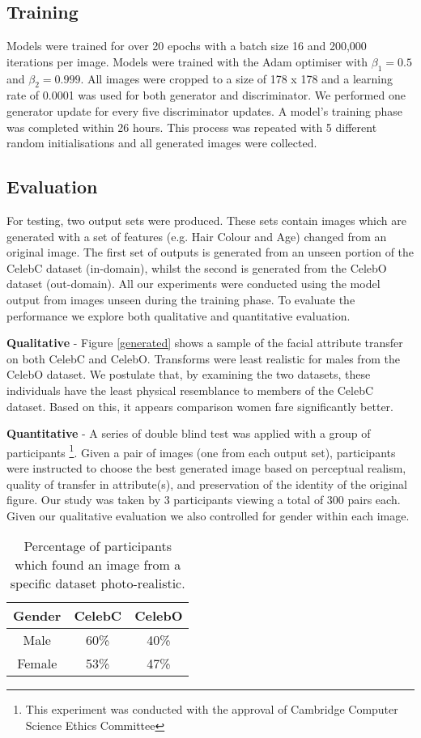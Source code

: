 \documentclass[10pt,twocolumn,letterpaper]{article}
\begin{document}
\subsection{Training}

Models were trained for over 20 epochs with a batch size 16 and 200,000 iterations per image. Models were trained with the Adam optimiser with $\beta_{1}=0.5$ and $\beta_{2}=0.999$. All images were cropped to a size of 178 x 178 and a learning rate of 0.0001 was used for both generator and discriminator. We performed one generator update for every five discriminator updates. A model's training phase was completed within 26 hours. This process was repeated with 5 different random initialisations and all generated images were collected. 

\subsection{Evaluation}

For testing, two output sets were produced. These sets contain images which are generated with a set of features (e.g. Hair Colour and Age) changed from an original image. The first set of outputs is generated from an unseen portion of the CelebC dataset (in-domain), whilst the second is generated from the CelebO dataset (out-domain). All our experiments were conducted using the model output from images unseen during the training phase. To evaluate the performance we explore both qualitative and quantitative evaluation.

\textbf{Qualitative} - Figure \ref{generated} shows a sample of the facial attribute transfer on both CelebC and CelebO. Transforms were least realistic for males from the CelebO dataset. We postulate that, by examining the two datasets, these individuals have the least physical resemblance to members of the CelebC dataset. Based on this, it appears comparison women fare significantly better.

\textbf{Quantitative} - A series of double blind test was applied with a group of participants \footnote{This experiment was conducted with the approval of Cambridge Computer Science Ethics Committee}. 
Given a pair of images (one from each output set), participants were instructed to choose the best generated
image based on perceptual realism, quality of transfer in attribute(s), and preservation of the identity of the original figure. Our study was taken by 3 participants viewing a total of 300 pairs each. Given our qualitative evaluation we also controlled for gender within each image.
\begin{table}[h!]
\begin{center}
\begin{tabular}{|c|c|c|}
\hline
Gender& CelebC & CelebO\\
\hline \hline
Male& 60\%& 40\% \\
Female &53\% & 47\%\\
\hline
\end{tabular}
\end{center}
\caption{Percentage of participants which found an image from a specific dataset photo-realistic.}
\end{table}
\end{document}
